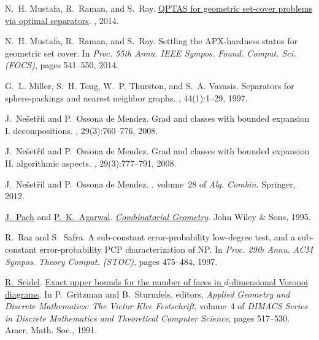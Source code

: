 \documentclass[12pt]{article}
\theoremstyle{remark}\theoremheaderfont{\sf}\theorembodyfont{\upshape}
\numberwithin{figure}{section}\numberwithin{table}{section}\numberwithin{equation}{section}
\begin{document}
{\begin{thebibliography}{vdSOdBV98}
N.~H. {Mustafa}, R.~{Raman}, and S.~{Ray}.
\newblock \href{http://arxiv.org/abs/1403.0835}{{QPTAS} for geometric set-cover
  problems via optimal separators}.
, 2014.

N.~H. Mustafa, R.~Raman, and S.~Ray.
\newblock  Settling the {APX}-hardness status for geometric set cover.
\newblock In {\em Proc. 55th Annu. IEEE Sympos. Found. Comput. Sci.
  {\em(FOCS)}}, pages 541--550, 2014.

G.~L. Miller, S.~H. Teng, W.~P. Thurston, and S.~A. Vavasis.
\newblock  Separators for sphere-packings and nearest neighbor graphs.
, 44(1):1--29, 1997.

J.~{Ne{\v s}et{\v r}il} and P.~{Ossona de Mendez}.
\newblock  Grad and classes with bounded expansion {I}. decompositions.
, 29(3):760--776, 2008.

J.~{Ne{\v s}et{\v r}il} and P.~{Ossona de Mendez}.
\newblock  Grad and classes with bounded expansion {II}. algorithmic aspects.
, 29(3):777--791, 2008.

J.~Ne{\v s}et{\v r}il and P.~{Ossona de Mendez}.
, volume~28 of
  {\em Alg. Combin.}
\newblock Springer, 2012.

\href{http://www.math.nyu.edu/~pach}{J.~{Pach}} and \href{http://www.cs.duke.edu/~pankaj}{P.~K.~{Agarwal}}.
\newblock \href{http://www.addall.com/Browse/Detail/0471588903.html}{{\em
  Combinatorial Geometry}}.
\newblock John Wiley \& Sons, 1995.

R.~Raz and S.~Safra.
\newblock  A sub-constant error-probability low-degree test, and a sub-constant
  error-probability {PCP} characterization of {NP}.
\newblock In {\em Proc. 29th Annu. ACM Sympos. Theory Comput. {\em(STOC)}},
  pages 475--484, 1997.

\href{http://www-tcs.cs.uni-sb.de/seidel/}{R.~{Seidel}}.
\newblock \href{http://dimacs.rutgers.edu/Volumes/Vol04.html}{Exact upper
  bounds for the number of faces in {$d$}-dimensional {V}oronoi diagrams}.
\newblock In P.~Gritzman and B.~Sturmfels, editors, {\em Applied Geometry and
  Discrete Mathematics: The Victor Klee Festschrift}, volume~4 of {\em DIMACS
  Series in Discrete Mathematics and Theoretical Computer Science}, pages
  517--530. Amer. Math. Soc., 1991.


\end{thebibliography}}
\end{document}
